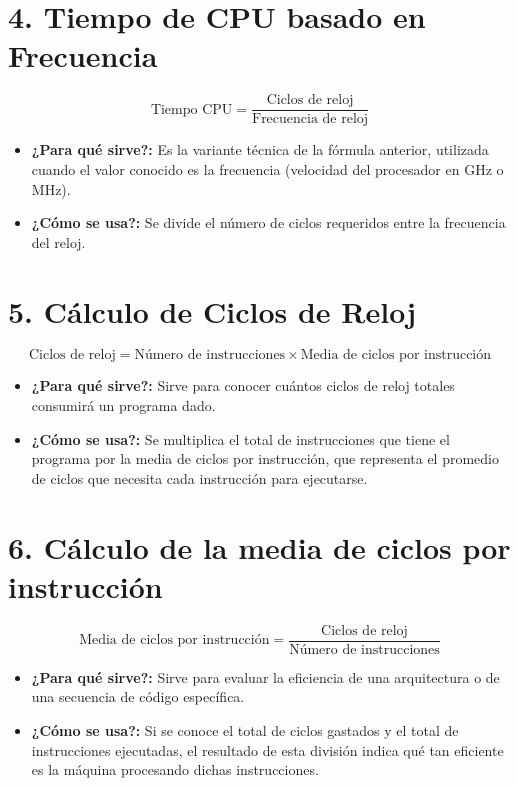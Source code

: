 \documentclass[12pt]{article}
\begin{document}
\section*{4. Tiempo de CPU basado en Frecuencia}
\begin{tcolorbox}[cajaformal]
\[ \text{Tiempo CPU} = \frac{\text{Ciclos de reloj}}{\text{Frecuencia de reloj}} \]
\end{tcolorbox}
\begin{itemize}
    \item \textbf{¿Para qué sirve?:} Es la variante técnica de la fórmula anterior, utilizada cuando el valor conocido es la frecuencia (velocidad del procesador en GHz o MHz).
    \item \textbf{¿Cómo se usa?:} Se divide el número de ciclos requeridos entre la frecuencia del reloj.
\end{itemize}

\section*{5. Cálculo de Ciclos de Reloj}
\begin{tcolorbox}[cajaformal]
\[ \text{Ciclos de reloj} = \text{Número de instrucciones} \times \text{Media de ciclos por instrucción} \]
\end{tcolorbox}
\begin{itemize}
    \item \textbf{¿Para qué sirve?:} Sirve para conocer cuántos ciclos de reloj totales consumirá un programa dado.
    \item \textbf{¿Cómo se usa?:} Se multiplica el total de instrucciones que tiene el programa por la media de ciclos por instrucción, que representa el promedio de ciclos que necesita cada instrucción para ejecutarse.
\end{itemize}

\section*{6. Cálculo de la media de ciclos por instrucción}
\begin{tcolorbox}[cajaformal]
\[ \text{Media de ciclos por instrucción} = \frac{\text{Ciclos de reloj}}{\text{Número de instrucciones}} \]
\end{tcolorbox}
\begin{itemize}
    \item \textbf{¿Para qué sirve?:} Sirve para evaluar la eficiencia de una arquitectura o de una secuencia de código específica.
    \item \textbf{¿Cómo se usa?:} Si se conoce el total de ciclos gastados y el total de instrucciones ejecutadas, el resultado de esta división indica qué tan eficiente es la máquina procesando dichas instrucciones.
\end{itemize}
\end{document}
